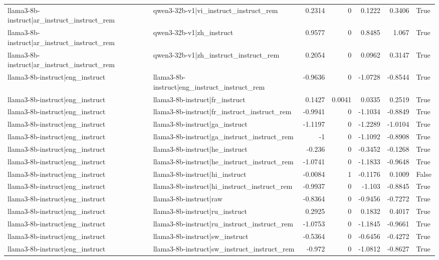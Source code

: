 \begin{table}
\begin{tabular}{l l r r r r l}
llama3-8b-instruct|ar_instruct_instruct_rem & qwen3-32b-v1|vi_instruct_instruct_rem & 0.2314 & 0 & 0.1222 & 0.3406 & True \\
llama3-8b-instruct|ar_instruct_instruct_rem & qwen3-32b-v1|zh_instruct & 0.9577 & 0 & 0.8485 & 1.067 & True \\
llama3-8b-instruct|ar_instruct_instruct_rem & qwen3-32b-v1|zh_instruct_instruct_rem & 0.2054 & 0 & 0.0962 & 0.3147 & True \\
llama3-8b-instruct|eng_instruct & llama3-8b-instruct|eng_instruct_instruct_rem & -0.9636 & 0 & -1.0728 & -0.8544 & True \\
llama3-8b-instruct|eng_instruct & llama3-8b-instruct|fr_instruct & 0.1427 & 0.0041 & 0.0335 & 0.2519 & True \\
llama3-8b-instruct|eng_instruct & llama3-8b-instruct|fr_instruct_instruct_rem & -0.9941 & 0 & -1.1034 & -0.8849 & True \\
llama3-8b-instruct|eng_instruct & llama3-8b-instruct|ga_instruct & -1.1197 & 0 & -1.2289 & -1.0104 & True \\
llama3-8b-instruct|eng_instruct & llama3-8b-instruct|ga_instruct_instruct_rem & -1 & 0 & -1.1092 & -0.8908 & True \\
llama3-8b-instruct|eng_instruct & llama3-8b-instruct|he_instruct & -0.236 & 0 & -0.3452 & -0.1268 & True \\
llama3-8b-instruct|eng_instruct & llama3-8b-instruct|he_instruct_instruct_rem & -1.0741 & 0 & -1.1833 & -0.9648 & True \\
llama3-8b-instruct|eng_instruct & llama3-8b-instruct|hi_instruct & -0.0084 & 1 & -0.1176 & 0.1009 & False \\
llama3-8b-instruct|eng_instruct & llama3-8b-instruct|hi_instruct_instruct_rem & -0.9937 & 0 & -1.103 & -0.8845 & True \\
llama3-8b-instruct|eng_instruct & llama3-8b-instruct|raw & -0.8364 & 0 & -0.9456 & -0.7272 & True \\
llama3-8b-instruct|eng_instruct & llama3-8b-instruct|ru_instruct & 0.2925 & 0 & 0.1832 & 0.4017 & True \\
llama3-8b-instruct|eng_instruct & llama3-8b-instruct|ru_instruct_instruct_rem & -1.0753 & 0 & -1.1845 & -0.9661 & True \\
llama3-8b-instruct|eng_instruct & llama3-8b-instruct|sw_instruct & -0.5364 & 0 & -0.6456 & -0.4272 & True \\
llama3-8b-instruct|eng_instruct & llama3-8b-instruct|sw_instruct_instruct_rem & -0.972 & 0 & -1.0812 & -0.8627 & True \\

\end{tabular}
\end{table}
